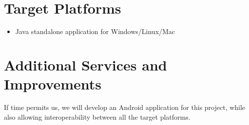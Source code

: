 \documentclass[a4paper]{article}
\begin{document}
\section{Target Platforms}

\begin{itemize}
\item Java standalone application for Windows/Linux/Mac
\end{itemize}

\section{Additional Services and Improvements}
If time permits us, we will develop an Android application for this project, while also allowing interoperability between all the target platforms.
\end{document}
